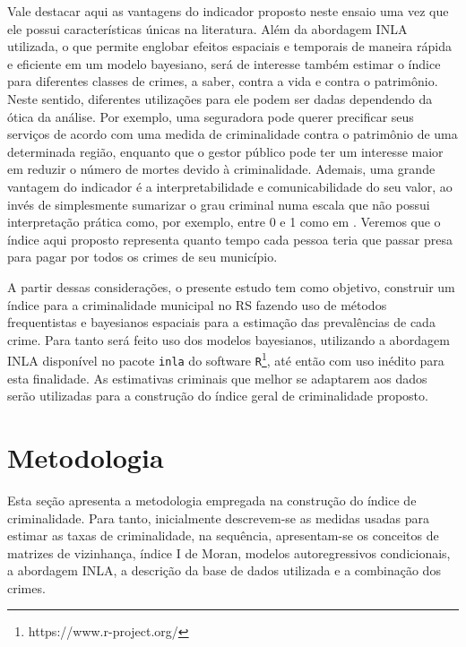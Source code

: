 \documentclass[12pt,openright,oneside,a4paper,english,french,spanish]{abntex2}
\numberwithin{table}{section} %
\numberwithin{figure}{section} %
\newcommand{\co}{\citeonline}
\begin{document}
Vale destacar aqui as vantagens do indicador proposto neste ensaio uma vez que ele possui características únicas na literatura. Além da abordagem INLA utilizada, o que permite englobar efeitos espaciais e temporais de maneira rápida e eficiente em um modelo bayesiano, será de interesse também estimar o índice para diferentes classes de crimes, a saber, contra a vida e contra o patrimônio. Neste sentido, diferentes utilizações para ele podem ser dadas dependendo da ótica da análise. Por exemplo, uma seguradora pode querer precificar seus serviços de acordo com uma medida de criminalidade contra o patrimônio de uma determinada região, enquanto que o gestor público pode ter um interesse maior em reduzir o número de mortes devido à criminalidade. Ademais, uma grande vantagem do indicador é a interpretabilidade e comunicabilidade do seu valor, ao invés de simplesmente sumarizar o grau criminal numa escala que não possui interpretação prática como, por exemplo, entre 0 e 1 como em \co{freitas2016xixeeg}. Veremos que o índice aqui proposto representa quanto tempo cada pessoa teria que passar presa para pagar por todos os crimes de seu município.

A partir dessas considerações, o presente estudo tem como objetivo, construir um índice para a criminalidade municipal no RS fazendo uso de métodos frequentistas e bayesianos espaciais para a estimação das prevalências de cada crime. Para tanto será feito uso dos modelos bayesianos, utilizando a abordagem INLA \cite{rue2009approximate,martino2009implementing} disponível no pacote \texttt{inla} do software \texttt{R}\footnote{https://www.r-project.org/}, até então com uso inédito para esta finalidade. As estimativas criminais que melhor se adaptarem aos dados serão utilizadas para a construção do índice geral de criminalidade proposto.

\section{Metodologia\label{sec:Metodologia_Indice}}

Esta seção apresenta a metodologia empregada na construção do índice de criminalidade. Para tanto, inicialmente descrevem-se as medidas usadas para estimar as taxas de criminalidade, na sequência, apresentam-se os conceitos de matrizes de vizinhança, índice I de Moran, modelos autoregressivos condicionais, a abordagem INLA, a descrição da base de dados utilizada e a combinação dos crimes. 
\end{document}

